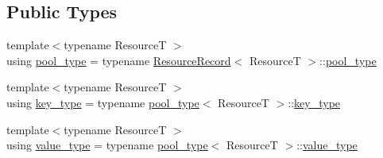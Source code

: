 \subsection*{Public Types}
\begin{DoxyCompactItemize}
\item 
{\footnotesize template$<$typename ResourceT $>$ }\\using \hyperlink{classmage_1_1rendering_1_1_resource_manager_ab21a4e280087032ee533f267bd9bf602}{pool\+\_\+type} = typename \hyperlink{structmage_1_1rendering_1_1_resource_manager_1_1_resource_record}{Resource\+Record}$<$ ResourceT $>$\+::\hyperlink{classmage_1_1rendering_1_1_resource_manager_ab21a4e280087032ee533f267bd9bf602}{pool\+\_\+type}
\item 
{\footnotesize template$<$typename ResourceT $>$ }\\using \hyperlink{classmage_1_1rendering_1_1_resource_manager_a097b505b275b411e02c73d1899e91a44}{key\+\_\+type} = typename \hyperlink{classmage_1_1rendering_1_1_resource_manager_ab21a4e280087032ee533f267bd9bf602}{pool\+\_\+type}$<$ ResourceT $>$\+::\hyperlink{classmage_1_1rendering_1_1_resource_manager_a097b505b275b411e02c73d1899e91a44}{key\+\_\+type}
\item 
{\footnotesize template$<$typename ResourceT $>$ }\\using \hyperlink{classmage_1_1rendering_1_1_resource_manager_abb6ad8fd8054364a230839110c42174f}{value\+\_\+type} = typename \hyperlink{classmage_1_1rendering_1_1_resource_manager_ab21a4e280087032ee533f267bd9bf602}{pool\+\_\+type}$<$ ResourceT $>$\+::\hyperlink{classmage_1_1rendering_1_1_resource_manager_abb6ad8fd8054364a230839110c42174f}{value\+\_\+type}
\end{DoxyCompactItemize}
